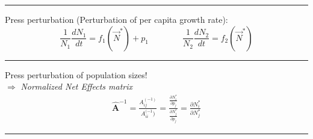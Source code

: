 \documentclass{article}
\begin{document}
\rule[0.5ex]{\linewidth}{1pt}

Press perturbation (Perturbation of per capita growth rate):\\
\begin{equation*}
	\frac{1}{N_1}\frac{dN_1}{dt}=f_1(\vec{N}^*)+p_1 \qquad \qquad  \frac{1}{N_2}\frac{dN_2}{dt}=f_2(\vec{N}^*)
\end{equation*}

\rule[0.5ex]{\linewidth}{1pt}

Press perturbation of population sizes!\\
$\Rightarrow$ \emph{Normalized Net Effects matrix}
\begin{align*}
\hat{\mathbf{A}}^{-1}=\frac{A_{ij}^{(-1)}}{A_{ii}^{(-1})}=\frac{\frac{\partial N_i^*}{\partial p_j}}{\frac{\partial N_j^*}{\partial p_j}}=\frac{\partial N_i^*}{\partial N_j^*}
\end{align*}



\rule[0.5ex]{\linewidth}{1pt}
\end{document}
